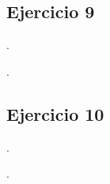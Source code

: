 \begin{Enunciado}
	\subsection*{Ejercicio 9}
    
	\lipsum[1].
\end{Enunciado}
\vspace*{1em}
\lipsum[1].
\vspace*{2em}
\begin{Enunciado}
	\subsection*{Ejercicio 10}
    
	\lipsum[1].
\end{Enunciado}
\vspace*{1em}
\lipsum[1].
